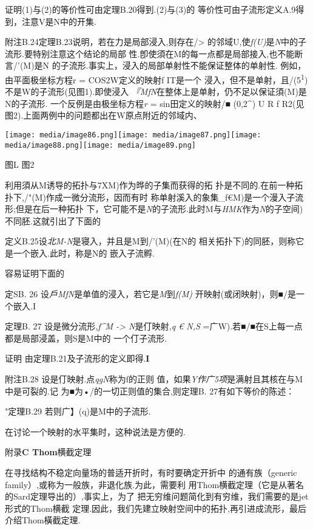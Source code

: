 \documentclass{article}
\begin{document}
证明(1)与(2)的等价性可由定理B.20得到.(2)与(3)的
等价性可由子流形定义A.9得到，注意V是N中的开集.\textbar{}

附注B.24定理B.23说明，若在力是局部浸入,则存在/\textgreater{}
的邻域U,使\emph{f(U)}是\emph{N}中的子流形.要特别注意这个结论的局部
性.卽使須在M的每一点都是局部接入,也不能断言/'(M)是N
的子流形.事实上，浸入的局部单射性不能保证整体的单射性.
例如，由平面极坐标方程r = COS2W定义的映射f IT是一个
浸入，但不是单射，且/(5\textsuperscript{1})不是W的子流形(见图1).即使浸入
\emph{『MfN}在整体上是单射，仍不足以保证須(M)是N的子流形.
一个反例是由极坐标方程\emph{r} = sin田定义的映射/■ (0,2\^{}) U R f
R2(见图2).上面两例中的问题都出在W原点附近的邻域内、

\texttt{[image: media/image86.png]}\texttt{[image: media/image87.png]}\texttt{[image: media/image88.png]}\texttt{[image: media/image89.png]}

图L 图2

利用須从M诱导的拓扑与7XM)作为晔的子集而获得的拓
扑是不同的.在前一种拓扑下,/"(M)作成一微分流形，因而有时
称单射溪入的象集\_f€M)是一个漫入子流形;但是在后一种拓扑
下，它可能不是\emph{N}的子流形.此时M与\emph{HMK}作为\emph{N}的子空间)
不同胚.这就引出了下面的

定义B.25设\emph{北M-N}是寝入，并且是M到/'(M)(在N的
相关拓扑下)的同胚，则称它是一个嵌入.此时，称是N的 嵌入子流孵.

容易证明下面的

定SB. 26 设\emph{戶MfN}是单值的浸入，若它是\emph{M}到\emph{f(M)}
开映射(或闭映射)，则■/是一个嵌入.I

定理B. 27 设是微分流形\emph{,f\^{}M -\textgreater{} N}是仃映射\emph{,q €
N,S} =广W).若■/■在S上每一点都是局部浸盖，则S是M中的 一个仃子流形.

证明 由定理B.21及子流形的定义即得.\textbf{I}

附注B.28 设是仃映射.点\emph{qgN}称为f的正则
值，如果\emph{Y作广5项}是满射且其核在与M中是可裂的.记
为■为•/的一切正则值的集合,则定理B. 27有如下等价的陈述：

"定理B.29 若则广】(q)是M中的子流形.\textbar{}

在讨论一个映射的水平集时，这种说法是方便的.

附录\textbf{C Thom}横截定理

在寻找结构不稳定向量场的普适开折时，有时要确定开折中 的通有族（generic
family）,或称为一般族，非退化族.为此，需要利
用Thom横截定理（它是从著名的Sard定理导出的）,事实上，为了
把无穷维问题简化到有穷维，我们需要的是jet形式的Thom横截
定理.因此，我们先建立映射空间中的拓扑,再引进成流形，最后
介绍Thom橫截定理.
\end{document}
